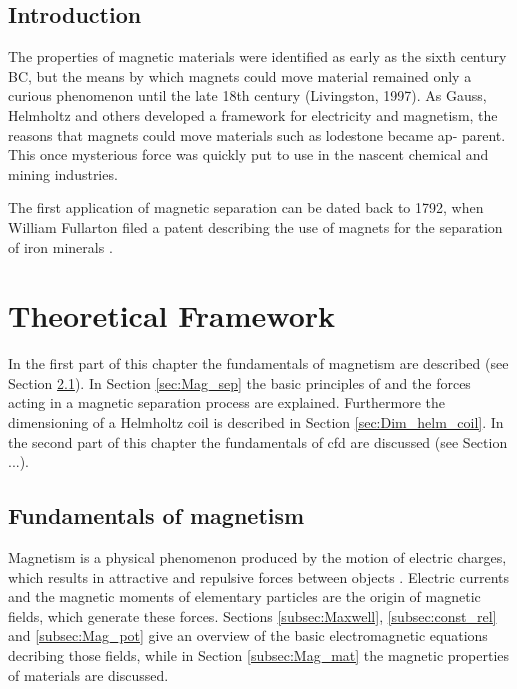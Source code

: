 


\section{Introduction}

The properties of magnetic materials were identified as early
as the sixth century BC, but the means by which magnets could
move material remained only a curious phenomenon until the late
18th century (Livingston, 1997). As Gauss, Helmholtz and others
developed a framework for electricity and magnetism, the reasons
that magnets could move materials such as lodestone became ap-
parent. This once mysterious force was quickly put to use in the
nascent chemical and mining industries. \cite{yavuz2009magnetic}

The first application of magnetic separation can be dated back to 1792, when William Fullarton filed a patent describing the use of magnets for the separation of iron minerals \cite{1794repertory}. 


\chapter{Theoretical Framework}
\label{chap:chap_theo}



In the first part of this chapter the fundamentals of magnetism are described (see Section \ref{sec:Fund_mag}). In Section \ref{sec:Mag_sep} the basic principles of and the forces acting in a magnetic separation process are explained. Furthermore the dimensioning of a Helmholtz coil is described in Section \ref{sec:Dim_helm_coil}.
In the second part of this chapter the fundamentals of \gls{cfd} are discussed (see Section ...). 

\section{Fundamentals of magnetism}
\label{sec:Fund_mag}
Magnetism is a physical phenomenon produced by the motion of electric charges, which results in attractive and repulsive forces between objects \cite{stevenson2010oxford}. Electric currents and the magnetic moments of elementary particles are the origin of magnetic fields, which generate these forces. Sections \ref{subsec:Maxwell}, \ref{subsec:const_rel} and \ref{subsec:Mag_pot} give an overview of the basic electromagnetic equations decribing those fields, while in Section \ref{subsec:Mag_mat} the magnetic properties of materials are discussed.

